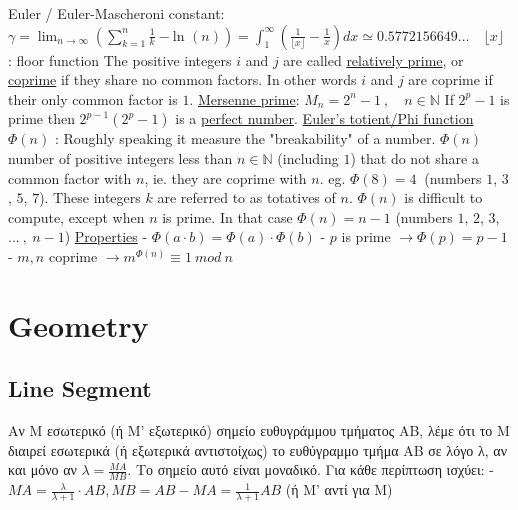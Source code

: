 \documentclass[12pt]{article}
\def\ln{\text{ln\ }} %
\begin{document}
\begin{flushleft}
	\textbullet \quad Euler / Euler-Mascheroni constant: \\ 
		$\displaystyle \gamma = \lim_{n\to\infty} \left(\sum \limits_{k=1}^n \frac{1}{k} - \ln(n) \right) = \int_{1}^{\infty} \left(\frac{1}{\lfloor x \rfloor} - \frac{1}{x} \right) dx \simeq 0.57 721 56649 \ldots \quad \lfloor x \rfloor $  :  floor function \linebreak 
	\textbullet \quad The positive integers $i$ and $j$ are called \uline{relatively prime}, or \uline{coprime} if they share no common factors. In other words $i$ and $j$ are coprime if their only common factor is $1$. \linebreak 
	\textbullet \quad \uline{Mersenne prime}: $ M_n = 2^n -1 \ , \quad n \in \mathbb{N} $ \linebreak 
	\textbullet \quad If $2^p -1$ is prime then $2^{p-1} (2^p -1) $ is a \uline{perfect number}. \linebreak 
	\textbullet \quad \uline{Euler's totient/Phi function} $\Phi(n)$  :  Roughly speaking it measure the "breakability" of a number. \linebreak 
	$\Phi(n)$ number of positive integers less than $n \in \mathbb{N}$ (including $1$) that do not share a common factor with $n$, ie. they are coprime with $n$. eg. $\Phi(8) = 4 \ $ (numbers $1$, $3$, $5$, $7$). These integers $k$ are referred to as totatives of $n$. \linebreak 
	$\Phi(n)$ is difficult to compute, except when $n$ is prime. In that case $\Phi(n) = n - 1$ (numbers $1$, $2$, $3$, $... \ , \ n-1$) \linebreak 
	\uline{Properties} \linebreak 
	\quad - $\Phi(a \cdot b) = \Phi(a) \cdot \Phi(b) $ \linebreak 
	\quad - $p$ is prime $\rightarrow \Phi(p) = p -1 $ \linebreak 
	\quad - $m, n$ coprime $ \rightarrow m^{\Phi(n)} \equiv 1\ mod\ n$ \linebreak 
	
	
	\pagebreak 

	
	\section{Geometry}

	\subsection{Line Segment}	
	
		\textbullet \quad \textgreek{Αν Μ εσωτερικό (ή Μ' εξωτερικό) σημείο ευθυγράμμου τμήματος ΑΒ, λέμε ότι το Μ διαιρεί εσωτερικά (ή εξωτερικά αντιστοίχως) το ευθύγραμμο τμήμα ΑΒ σε λόγο λ, αν και μόνο αν} $\displaystyle  \lambda =\frac{MA}{MB}$. \textgreek{Το σημείο αυτό είναι μοναδικό. Για κάθε περίπτωση ισχύει:} \linebreak 
	- $\displaystyle MA = \frac{\lambda}{\lambda + 1} \cdot AB , MB = AB - MA = \frac{1}{\lambda + 1} AB $ \textgreek{(ή Μ' αντί για Μ)} \linebreak 
	

\end{flushleft}
\end{document}
